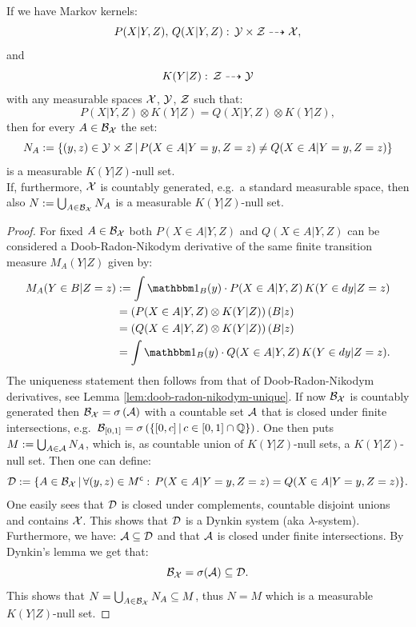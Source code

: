 \begin{Lem}
    \label{ess-unique}
    If we have Markov kernels:    
    \[P(X|Y,Z),\,Q(X|Y,Z):\, \mathcal{Y}\times \mathcal{Z} \dashrightarrow \mathcal{X},\]
    and 
    \[K(Y|Z):\,\mathcal{Z} \dashrightarrow \mathcal{Y}\]
    with any measurable spaces $\mathcal{X}$, $\mathcal{Y}$, $\mathcal{Z}$ such that:
    \[ P(X|Y,Z) \otimes K(Y|Z) = Q(X|Y,Z) \otimes K(Y|Z), \]
    then for every $A \in \mathcal{B}_{\mathcal{X}}$ the set:
    \[N_A := \left \{ (y,z) \in \mathcal{Y} \times \mathcal{Z} \,|\, P(X \in A|Y=y,Z=z) \neq Q(X \in A|Y=y,Z=z)\right \}\]
     is a measurable $K(Y|Z)$-null set. \\
     If, furthermore, $\mathcal{X}$ is countably generated, e.g.\ a standard measurable space,
     then also $N := \bigcup_{A \in \mathcal{B}_{\mathcal{X}}} N_A$ is a measurable $K(Y|Z)$-null set.
     \begin{proof}
         For fixed $A \in \mathcal{B}_{\mathcal{X}}$ both $P(X \in A|Y,Z)$ and $Q(X \in A|Y,Z)$ can be considered
         a Doob-Radon-Nikodym derivative of the same finite transition measure $M_A(Y|Z)$ given by:
         \begin{align*} M_A(Y \in B|Z=z)&:= \int \I_B(y) \cdot P(X \in A|Y,Z)\, K(Y \in dy|Z=z) \\
             & = \lp P(X \in A|Y,Z) \otimes K(Y|Z) \rp(B|z) \\
             & = \lp Q(X \in A|Y,Z) \otimes K(Y|Z) \rp(B|z) \\
             & = \int \I_B(y) \cdot Q(X \in A|Y,Z)\, K(Y \in dy|Z=z).
         \end{align*}
         The uniqueness statement then follows from that of Doob-Radon-Nikodym derivatives, see Lemma \ref{lem:doob-radon-nikodym-unique}.
         If now $\mathcal{B}_{\mathcal{X}}$ is countably generated then $\mathcal{B}_{\mathcal{X}} =\sigma\left ( \mathcal{A}\right )$ 
         with a countable set $\mathcal{A}$ that is closed under finite intersections, e.g.\ 
         $\mathcal{B}_{[0,1]}=\sigma\left (\left \{[0,c]\,|\, c \in [0,1] \cap \mathbb{Q}\right \}\right )$. 
         One then puts $M:=\bigcup_{A \in \mathcal{A}} N_A$, which is, as countable union of $K(Y|Z)$-null sets, a $K(Y|Z)$-null set.
         Then one can define:
         \[ \mathcal{D} := \{ A \in \mathcal{B}_{\mathcal{X}} \,|\, \forall (y,z) \in M^{\mathsf{c}}:\, P(X \in A|Y=y,Z=z)=Q(X \in A|Y=y,Z=z) \}.\]
         One easily sees that $\mathcal{D}$ is closed under complements, countable disjoint unions and contains $\mathcal{X}$.
         This shows that $\mathcal{D}$ is a Dynkin system (aka $\lambda$-system).
         Furthermore, we have: $\mathcal{A} \subseteq \mathcal{D}$ and that $\mathcal{A}$ is closed under finite intersections. 
         By Dynkin's lemma we get that:
         \[\mathcal{B}_{\mathcal{X}} = \sigma(\mathcal{A}) \subseteq \mathcal{D}.\]
         This shows that $N = \bigcup_{A \in \mathcal{B}_{\mathcal{X}}}N_A \subseteq M$, thus $N = M$ which is a measurable $K(Y|Z)$-null set.
     \end{proof}
 \end{Lem}

